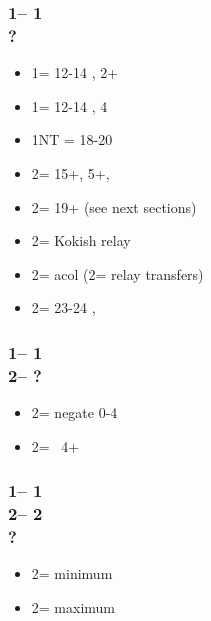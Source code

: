 \documentclass[12pt, a4paper]{report}
\begin{document}
\begin{bidpage}
\subsubsection*{1\clubs -- 1\diams\\
                ?}
\begin{itemize}
    \item 1\hearts = 12-14 \bal, 2+\hearts
    \item 1\spades = 12-14 \bal, 4\spades
    \item 1NT = 18-20 \bal
    \item 2\clubs = 15+, 5+\clubs, \nf
    \item 2\diams = 19+ \unbal (see next sections)
    \item 2\hearts = Kokish relay
    \item 2\spades = acol \spades (2\nt = relay \then transfers)
    \item 2\nt = 23-24 \bal, \nf
\end{itemize}
\end{bidpage}

\begin{bidpage}
\subsubsection*{1\clubs -- 1\diams\\
                2\diams -- ?}
\begin{itemize}
    \item 2\hearts = negate 0-4
    \item 2\spades = \gf\ 4+
\end{itemize}
\end{bidpage}

\begin{bidpage}
\subsubsection*{1\clubs -- 1\diams\\
                2\diams -- 2\hearts\\
                ?}
\begin{itemize}
    \item 2\spades = minimum
    \item 2\nt = maximum
\end{itemize}
\end{bidpage}
\end{document}
